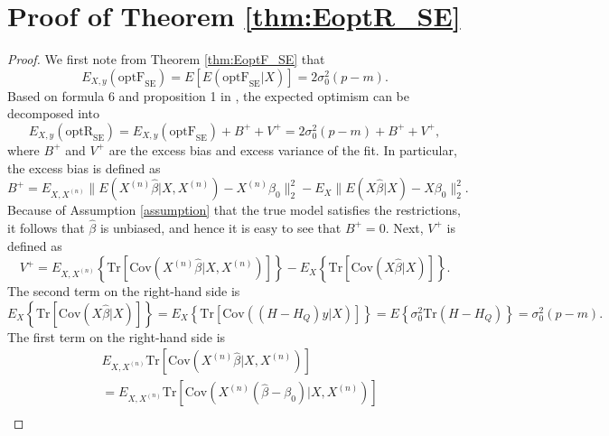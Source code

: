 \section{Proof of Theorem \ref{thm:EoptR_SE}}
\begin{proof}

We first note from Theorem \ref{thm:EoptF_SE} that
\begin{equation*}
E_{X,y}(\text{optF}_\text{SE}) = E \left[ E(\text{optF}_\text{SE} | X ) \right] = 2 \sigma_0^2(p-m).
\end{equation*}
Based on formula 6 and proposition 1 in , the expected optimism can be decomposed into 
\begin{equation*}
E_{X,y}(\text{optR}_\text{SE}) = E_{X,y}(\text{optF}_\text{SE}) + B^+ + V^+ = 2 \sigma_0^2(p-m) +  B^+ + V^+,
\end{equation*}
where $B^+$ and $V^+$ are the excess bias and excess variance of the fit. In particular, the excess bias is defined as
\begin{equation*}
B^+ = E_{X,X^{(n)}} \big\lVert E( X^{(n)} \hat{\beta} \big | X, X^{(n)} ) - X^{(n)} \beta_0 \big\rVert_2^2 - E_X \big\lVert E( X \hat{\beta} \big | X ) - X \beta_0 \big\rVert_2^2.
\end{equation*}
Because of Assumption \ref{assumption} that the true model satisfies the restrictions, it follows that $\hat{\beta}$ is unbiased, and hence it is easy to see that $B^+=0$. Next, $V^+$ is defined as
\begin{equation*}
V^+ = E_{X,X^{(n)}} \left\{ \text{Tr} \left[ \text{Cov}\left( X^{(n)}\hat{\beta} \big | X, X^{(n)} \right) \right] \right\} - E_X \left\{ \text{Tr} \left[ \text{Cov}\left( X\hat{\beta} \big | X \right)  \right] \right\}.
\end{equation*}
The second term on the right-hand side is
\begin{equation*}
E_X \left\{  \text{Tr} \left[ \text{Cov} \left( X\hat{\beta} \big | X \right)  \right] \right\} = E_X \left\{ \text{Tr} \left[ \text{Cov} \left( (H-H_Q)y \big | X \right)  \right] \right\} = E\left\{  \sigma_0^2 \text{Tr} \left( H-H_Q  \right) \right\}= \sigma_0^2 (p-m).
\end{equation*}
The first term on the right-hand side is
\begin{equation*}
\begin{aligned}
& E_{X,X^{(n)}} \text{Tr} \left[ \text{Cov}\left( X^{(n)}\hat{\beta} \big | X, X^{(n)} \right) \right] \\
&= E_{X,X^{(n)}} \text{Tr} \left[ \text{Cov} \left( X^{(n)} (\hat{\beta} -\beta_0) \big | X, X^{(n)} \right) \right] \\

\end{aligned}
\end{equation*}
\end{proof}
